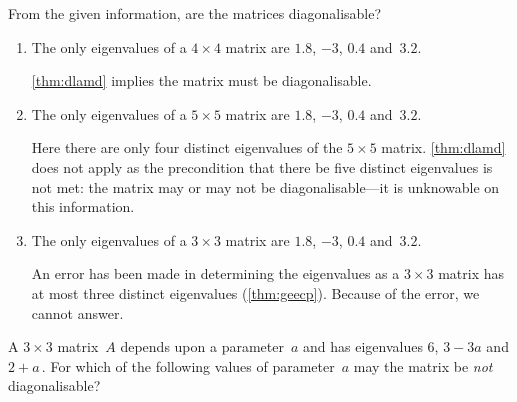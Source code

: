 \begin{example} \label{eg:}
From the given information, are the matrices diagonalisable?
\begin{enumerate}
\item The only eigenvalues of a \(4\times 4\) matrix are \(1.8\), \(-3\), \(0.4\) and~\(3.2\).
\begin{solution} 
\autoref{thm:dlamd} implies the matrix must be diagonalisable.
\end{solution}

\item The only eigenvalues of a \(5\times 5\) matrix are \(1.8\), \(-3\), \(0.4\) and~\(3.2\).
\begin{solution} 
Here there are only four distinct eigenvalues of the \(5\times5\) matrix.
\autoref{thm:dlamd} does not apply as the precondition that there be five distinct eigenvalues is not met: the matrix may or may not be diagonalisable---it is unknowable on this information.
\end{solution}

\item The only eigenvalues of a \(3\times 3\) matrix are \(1.8\), \(-3\), \(0.4\) and~\(3.2\).
\begin{solution} 
An error has been made in determining the eigenvalues as a \(3\times3\) matrix has at most three distinct eigenvalues (\autoref{thm:geecp}).
Because of the error, we cannot answer.
\end{solution}

\end{enumerate}
\end{example}



\begin{activity}
A \(3\times3\) matrix~\(A\) depends upon a parameter~\(a\) and has eigenvalues \(6\), \(3-3a\) and \(2+a\)\,.
For which of the following values of parameter~\(a\) may the matrix be \emph{not} diagonalisable?
\end{activity}





